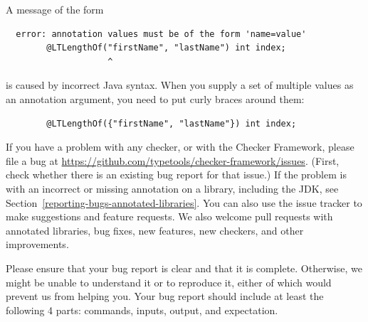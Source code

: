 
A message of the form

\begin{Verbatim}
  error: annotation values must be of the form 'name=value'
        @LTLengthOf("firstName", "lastName") int index;
                    ^
\end{Verbatim}

\noindent
is caused by incorrect Java syntax.  When you supply a set of multiple
values as an annotation argument, you need to put curly braces around them:

\begin{Verbatim}
        @LTLengthOf({"firstName", "lastName"}) int index;
\end{Verbatim}



If you have a problem with any checker, or with the Checker Framework,
please file a bug at
\url{https://github.com/typetools/checker-framework/issues}.
(First, check whether there is an existing bug report for that issue.)
If the problem is with an incorrect or missing annotation on a library,
including the JDK, see Section~\ref{reporting-bugs-annotated-libraries}.
You can also use the issue tracker to make suggestions and feature
requests.  We also welcome pull requests with annotated libraries, bug
fixes, new features, new checkers, and other improvements.

Please ensure that your bug report is clear and that it is complete.
Otherwise, we might be unable to understand it or to reproduce it, either of
which would prevent us from helping you.  Your bug report should include at
least the following 4 parts: commands, inputs, output, and expectation.


